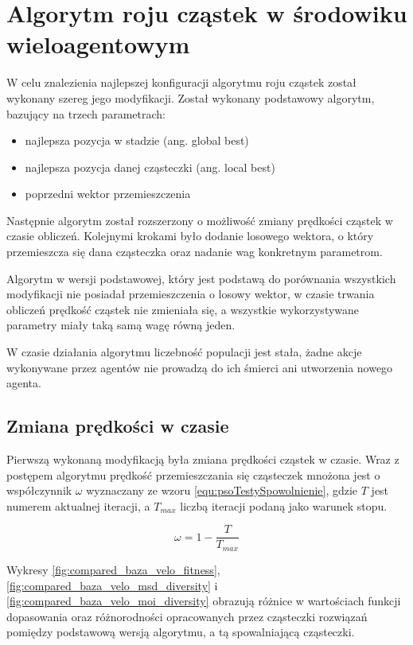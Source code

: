 \chapter{Algorytm roju cząstek w środowiku wieloagentowym}
\label{cha:psoTesty}

W celu znalezienia najlepszej konfiguracji algorytmu roju cząstek został wykonany szereg jego modyfikacji. Został wykonany podstawowy algorytm, bazujący na trzech parametrach:
\begin{itemize}
\item najlepsza pozycja w stadzie (ang. global best) 
\item najlepsza pozycja danej cząsteczki (ang. local best)
\item poprzedni wektor przemieszczenia
\end{itemize}

Następnie algorytm został rozszerzony o możliwość zmiany prędkości cząstek w czasie obliczeń. Kolejnymi krokami było dodanie losowego wektora, o który przemieszcza się dana cząsteczka oraz nadanie wag konkretnym parametrom. 

Algorytm w wersji podstawowej, który jest podstawą do porównania wszystkich modyfikacji nie posiadał przemieszczenia o losowy wektor, w czasie trwania obliczeń prędkość cząstek nie zmieniała się, a wszystkie wykorzystywane parametry miały taką samą wagę równą jeden.

W czasie działania algorytmu liczebność populacji jest stała, żadne akcje wykonywane przez agentów nie prowadzą do ich śmierci ani utworzenia nowego agenta.


\section{Zmiana prędkości w czasie}
\label{sec:psotestyspowolnienie}

Pierwszą wykonaną modyfikacją była zmiana prędkości cząstek w czasie. Wraz z postępem algorytmu prędkość przemieszczania się cząsteczek mnożona jest o współczynnik $\omega$ wyznaczany ze wzoru \ref{equ:psoTestySpowolnienie}, gdzie $T$ jest numerem aktualnej iteracji, a $T_{max}$ liczbą iteracji podaną jako warunek stopu.

\begin{equation}
\label{equ:psoTestySpowolnienie}
\omega = 1 - \frac{T}{T_{max}}
\end{equation}

Wykresy \ref{fig:compared_baza_velo_fitness}, \ref{fig:compared_baza_velo_msd_diversity} i \ref{fig:compared_baza_velo_moi_diversity} obrazują różnice w wartościach funkcji dopasowania oraz różnorodności opracowanych przez cząsteczki rozwiązań pomiędzy podstawową wersją algorytmu, a tą spowalniającą cząsteczki.


